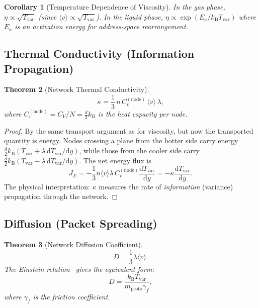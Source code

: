 \documentclass[11pt,twocolumn,a4paper]{article}
\newtheorem{theorem}{Theorem}[section]
\newtheorem{corollary}[theorem]{Corollary}
\theoremstyle{definition}
\theoremstyle{remark}
\newcommand{\kB}{k_{\mathrm{B}}}
\newcommand{\Tvar}{T_{\mathrm{var}}}
\newcommand{\mpr}{m_{\mathrm{proto}}}
\newcommand{\dd}{\mathrm{d}}
\newcommand{\avg}[1]{\langle #1 \rangle}
\begin{document}
\begin{corollary}[Temperature Dependence of Viscosity]\label{cor:visc_temp}
In the gas phase, $\eta\propto\sqrt{\Tvar}$ (since $\avg{v}\propto\sqrt{\Tvar}$).
In the liquid phase, $\eta\propto\exp(E_a/\kB\Tvar)$ where $E_a$ is an
activation energy for address-space rearrangement.
\end{corollary}

\subsection{Thermal Conductivity (Information Propagation)}\label{sec:conductivity}

\begin{theorem}[Network Thermal Conductivity]\label{thm:conductivity}
\begin{equation}\label{eq:conductivity}
  \kappa = \frac{1}{3}\,n\,C_v^{(\mathrm{node})}\,\avg{v}\,\lambda,
\end{equation}
where $C_v^{(\mathrm{node})}=C_V/N=\frac{d}{2}\kB$ is the heat capacity per
node.
\end{theorem}

\begin{proof}
By the same transport argument as for viscosity, but now the transported
quantity is energy.  Nodes crossing a plane from the hotter side carry energy
$\frac{d}{2}\kB(\Tvar+\lambda\,\dd\Tvar/\dd y)$, while those from the cooler
side carry $\frac{d}{2}\kB(\Tvar-\lambda\,\dd\Tvar/\dd y)$.  The net energy
flux is
\[
  J_E = -\frac{1}{3}n\avg{v}\lambda\,C_v^{(\mathrm{node})}
  \frac{\dd\Tvar}{\dd y} = -\kappa\frac{\dd\Tvar}{\dd y}.
\]
The physical interpretation: $\kappa$ measures the rate of \emph{information}
(variance) propagation through the network.
\end{proof}

\subsection{Diffusion (Packet Spreading)}\label{sec:diffusion}

\begin{theorem}[Network Diffusion Coefficient]\label{thm:diffusion}
\begin{equation}\label{eq:diffusion}
  D = \frac{1}{3}\lambda\avg{v}.
\end{equation}
The Einstein relation~\cite{Einstein1905} gives the equivalent form:
\begin{equation}\label{eq:einstein}
  D = \frac{\kB\Tvar}{\mpr\gamma_f},
\end{equation}
where $\gamma_f$ is the friction coefficient.
\end{theorem}
\end{document}
